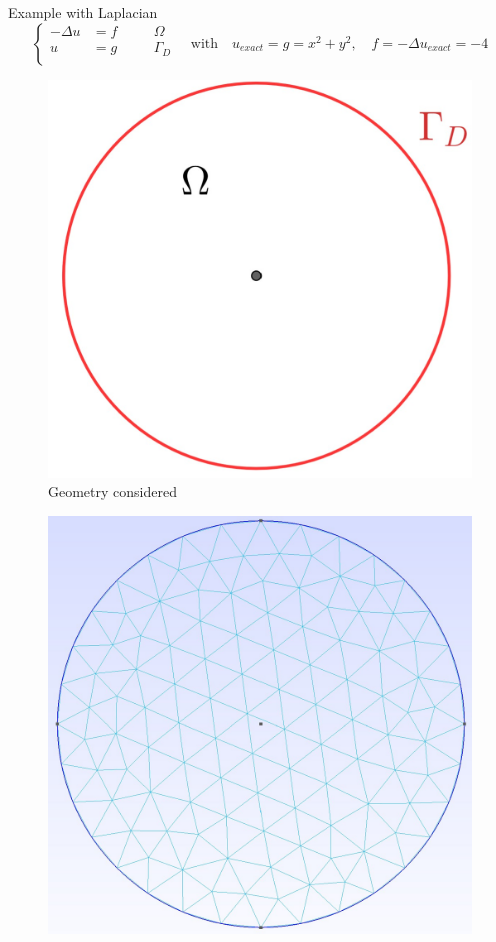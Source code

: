 \begin{frame}[allowframebreaks]{Example with Laplacian}
	$$\left\{\begin{aligned}
		-\Delta u &= f \quad&&\Omega \\
		u&=g \quad&&\Gamma_D \\
	\end{aligned}\right. \quad \text{with} \quad
	u_{exact}=g=x^2+y^2, \quad f=-\Delta u_{exact}=-4$$
	\begin{minipage}{0.31\linewidth}
		\begin{figure}
			\includegraphics[width=\linewidth]{"images/parareal/circle.jpg"}
			\caption{Geometry considered}
		\end{figure}
	\end{minipage} \quad
	\begin{minipage}{0.31\linewidth}
		\begin{figure}
			\includegraphics[width=\linewidth]{"images/parareal/circle_mesh.jpg"}

\end{figure}
\end{minipage}
\end{frame}
